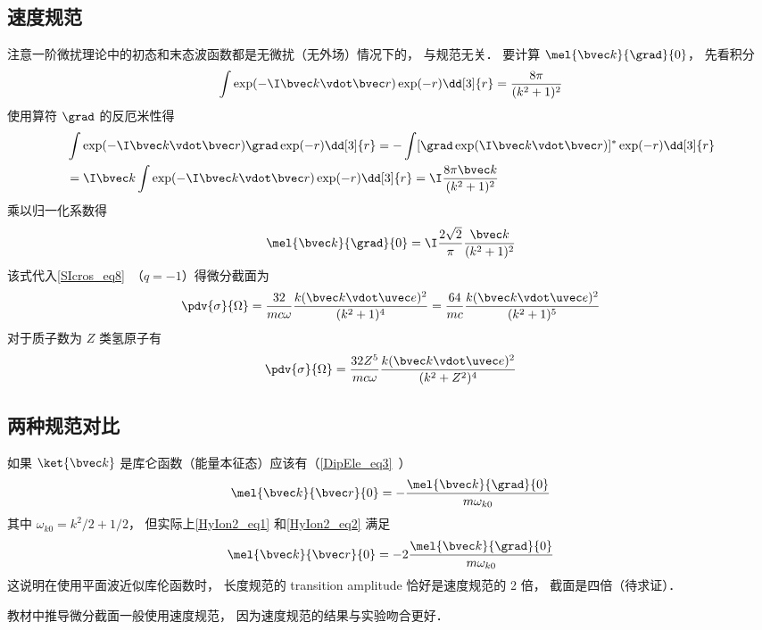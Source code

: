 \subsection{速度规范}
注意一阶微扰理论中的初态和末态波函数都是无微扰（无外场）情况下的， 与规范无关． 要计算 $\mel{\bvec k}{\grad}{0}$， 先看积分
\begin{equation}
\int \exp(-\I \bvec k \vdot \bvec r) \exp(-r) \dd[3]{r} = \frac{8\pi }{(k^2 + 1)^2}
\end{equation}
使用算符 $\grad$ 的反厄米性得
\begin{equation}
\begin{aligned}
&\int \exp(-\I \bvec k \vdot \bvec r) \grad \exp(-r) \dd[3]{r}
= -\int [\grad \exp(\I \bvec k \vdot \bvec r)]^* \exp(-r) \dd[3]{r}\\
&= \I \bvec k \int \exp(-\I \bvec k \vdot \bvec r) \exp(-r) \dd[3]{r}
= \I \frac{8 \pi  \bvec k}{(k^2 + 1)^2}
\end{aligned}
\end{equation}
乘以归一化系数得
\begin{equation}\label{HyIon2_eq2}
\mel{\bvec k}{\grad}{0} = \I\frac{2\sqrt{2}}{\pi}\frac{\bvec k}{(k^2 + 1)^2}
\end{equation}
该式代入\autoref{SIcros_eq8}~（$q = -1$）得微分截面为
\begin{equation}
\pdv{\sigma}{\Omega} = \frac{32}{mc\omega} \frac{k(\bvec k \vdot \uvec e)^2}{(k^2 + 1)^4}
= \frac{64}{mc} \frac{k(\bvec k \vdot \uvec e)^2}{(k^2 + 1)^5}
\end{equation}
对于质子数为 $Z$ 类氢原子有
\begin{equation}
\pdv{\sigma}{\Omega} = \frac{32 Z^5}{mc\omega} \frac{k(\bvec k \vdot \uvec e)^2}{(k^2 + Z^2)^4}
\end{equation}

\subsection{两种规范对比}
如果 $\ket{\bvec k}$ 是库仑函数（能量本征态）应该有（\autoref{DipEle_eq3}~）
\begin{equation}
\mel{\bvec k}{\bvec r}{0} = -\frac{\mel{\bvec k}{\grad}{0}}{m\omega_{k0}}
\end{equation}
其中 $\omega_{k0} = k^2/2 + 1/2$， 但实际上\autoref{HyIon2_eq1} 和\autoref{HyIon2_eq2} 满足
\begin{equation}
\mel{\bvec k}{\bvec r}{0} = -2\frac{\mel{\bvec k}{\grad}{0}}{m\omega_{k0}}
\end{equation}
这说明在使用平面波近似库伦函数时， 长度规范的 transition amplitude 恰好是速度规范的 2 倍， 截面是四倍（待求证）．

教材中推导微分截面一般使用速度规范， 因为速度规范的结果与实验吻合更好．
